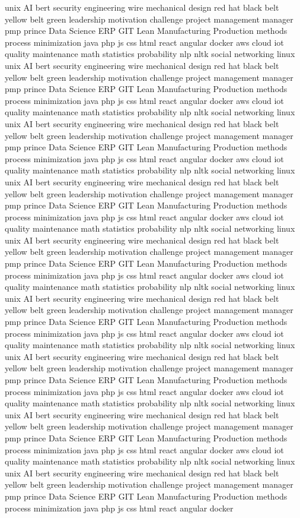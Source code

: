 \documentclass[letterpaper,11pt]{article}
\begin{document}
unix AI bert security engineering wire mechanical design red hat black belt yellow belt green leadership motivation challenge project management manager pmp prince Data Science ERP GIT Lean Manufacturing Production methods process minimization java php js css html react angular docker aws cloud iot quality maintenance math statistics probability nlp nltk social networking linux unix AI bert security engineering wire mechanical design red hat black belt yellow belt green leadership motivation challenge project management manager pmp prince Data Science ERP GIT Lean Manufacturing Production methods process minimization java php js css html react angular docker aws cloud iot quality maintenance math statistics probability nlp nltk social networking linux unix AI bert security engineering wire mechanical design red hat black belt yellow belt green leadership motivation challenge project management manager pmp prince Data Science ERP GIT Lean Manufacturing Production methods process minimization java php js css html react angular docker aws cloud iot quality maintenance math statistics probability nlp nltk social networking linux unix AI bert security engineering wire mechanical design red hat black belt yellow belt green leadership motivation challenge project management manager pmp prince Data Science ERP GIT Lean Manufacturing Production methods process minimization java php js css html react angular docker aws cloud iot quality maintenance math statistics probability nlp nltk social networking linux unix AI bert security engineering wire mechanical design red hat black belt yellow belt green leadership motivation challenge project management manager pmp prince Data Science ERP GIT Lean Manufacturing Production methods process minimization java php js css html react angular docker aws cloud iot quality maintenance math statistics probability nlp nltk social networking linux unix AI bert security engineering wire mechanical design red hat black belt yellow belt green leadership motivation challenge project management manager pmp prince Data Science ERP GIT Lean Manufacturing Production methods process minimization java php js css html react angular docker aws cloud iot quality maintenance math statistics probability nlp nltk social networking linux unix AI bert security engineering wire mechanical design red hat black belt yellow belt green leadership motivation challenge project management manager pmp prince Data Science ERP GIT Lean Manufacturing Production methods process minimization java php js css html react angular docker aws cloud iot quality maintenance math statistics probability nlp nltk social networking linux unix AI bert security engineering wire mechanical design red hat black belt yellow belt green leadership motivation challenge project management manager pmp prince Data Science ERP GIT Lean Manufacturing Production methods process minimization java php js css html react angular docker aws cloud iot quality maintenance math statistics probability nlp nltk social networking linux unix AI bert security engineering wire mechanical design red hat black belt yellow belt green leadership motivation challenge project management manager pmp prince Data Science ERP GIT Lean Manufacturing Production methods process minimization java php js css html react angular docker 
\end{document}
